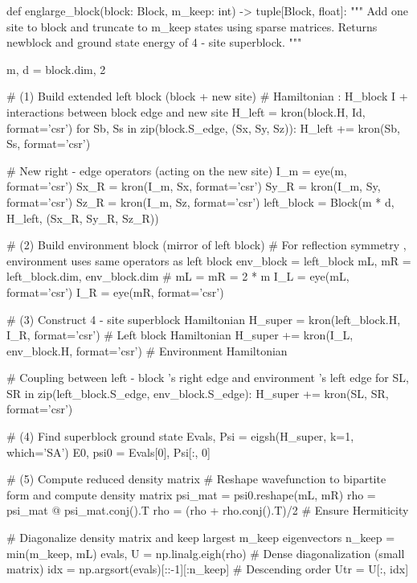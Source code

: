 \documentclass{article}
\begin{document}
\begin{python}
    def englarge_block(block: Block, m_keep: int) -> tuple[Block, float]:
        """
        Add one site to block and truncate to m_keep states using sparse matrices. 
        Returns newblock and ground state energy of 4 - site superblock.
        """
    
        m, d = block.dim, 2

        # (1) Build extended left block (block + new site)
        # Hamiltonian : H_block I + interactions between block edge and new site
        H_left = kron(block.H, Id, format='csr')
        for Sb, Ss in zip(block.S_edge, (Sx, Sy, Sz)):
            H_left += kron(Sb, Ss, format='csr')

        # New right - edge operators (acting on the new site)
        I_m = eye(m, format='csr')
        Sx_R = kron(I_m, Sx, format='csr')
        Sy_R = kron(I_m, Sy, format='csr')
        Sz_R = kron(I_m, Sz, format='csr')
        left_block = Block(m * d, H_left, (Sx_R, Sy_R, Sz_R))

        # (2) Build environment block (mirror of left block)
        # For reflection symmetry , environment uses same operators as left block
        env_block = left_block
        mL, mR = left_block.dim, env_block.dim # mL = mR = 2 * m
        I_L = eye(mL, format='csr')
        I_R = eye(mR, format='csr')

        # (3) Construct 4 - site superblock Hamiltonian    
        H_super = kron(left_block.H, I_R, format='csr') # Left block Hamiltonian
        H_super += kron(I_L, env_block.H, format='csr') # Environment Hamiltonian

        # Coupling between left - block ’s right edge and environment ’s left edge
        for SL, SR in zip(left_block.S_edge, env_block.S_edge):
            H_super += kron(SL, SR, format='csr')

        # (4) Find superblock ground state
        Evals, Psi = eigsh(H_super, k=1, which='SA')
        E0, psi0 = Evals[0], Psi[:, 0]

        # (5) Compute reduced density matrix
        # Reshape wavefunction to bipartite form and compute density matrix
        psi_mat = psi0.reshape(mL, mR)
        rho = psi_mat @ psi_mat.conj().T
        rho = (rho + rho.conj().T)/2 # Ensure Hermiticity

        # Diagonalize density matrix and keep largest m_keep eigenvectors
        n_keep = min(m_keep, mL)
        evals, U = np.linalg.eigh(rho) # Dense diagonalization (small matrix)
        idx = np.argsort(evals)[::-1][:n_keep] # Descending order
        Utr = U[:, idx]


\end{python}
\end{document}
